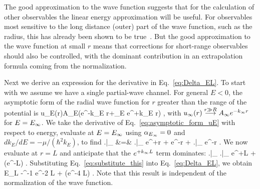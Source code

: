 	The good approximation to the wave function suggests that for the
	calculation of other observables the linear energy approximation will
	be useful.  For observables most sensitive to the long distance
	(outer) part of the wave function, such as the radius, this has
	already been shown to be true~\cite{Furnstahl:2012qg}. But the good
	approximation to the wave function at small $r$ means that corrections
	for short-range observables should also be controlled, with the
	dominant contribution in an extrapolation formula coming from the
	normalization.

	Next we derive an expression for the derivative in
	Eq.~\eqref{eq:Delta_EL}.  To start with we assume we have a single
	partial-wave channel.  For general $E < 0$, the asymptotic form of the
	radial wave function for $r$ greater than the range of the potential is
	\beq
	  u_E(r)\longrightarrow A_E(e^{-k_E r}+\alpha_E e^{+k_E r})
	  \;,
	  \label{eq:asymptotic_form_uE}
	\eeq
	with $u_\infty(r)\overset{r \gg R}\longrightarrow A_{\infty} e^{-k_{\infty} r}$
	for $E=E_{\infty}$.  We take the derivative of
	Eq.~\eqref{eq:asymptotic_form_uE} with respect to energy, evaluate at
	$E=E_{\infty}$ using $\alpha_{E_{\infty}}=0$ and $dk_E/dE = -\mu/(\hbar^2 k_E)$,
	to find
	\bea
	    \left.\right|_{\Einf} &=&
	    \Ainf \left.\right|_{\Einf} e^{+\kinf r}
	    +
	    \Ainf {} e^{-\kinf r}
	    +
	    \left.\right|_{\Einf} e^{-\kinf r}
	    \;.
	  \label{eq:entire_correction}
	\eea
	We now evaluate at $r=L$ and anticipate that the $e^{+k_{\infty} L}$ term
	dominates:
	\beq
	  \left.\right|_{\Einf}
	  \approx \Ainf \left.\right|_{\Einf} e^{+\kinf L}
	   + (e^{-\kinf L})
	   \;.
	  \label{eq:substitute_this}
	\eeq
	Substituting Eq.~\eqref{eq:substitute_this} into
	Eq.~\eqref{eq:Delta_EL}, we obtain
	\beq \Delta E_L \approx -^{-1} e^{-2 \kinf L} + (e^{-4
	  \kinf L}) \;.
	\eeq
	Note that this result is independent of	the normalization of the
	wave function.

